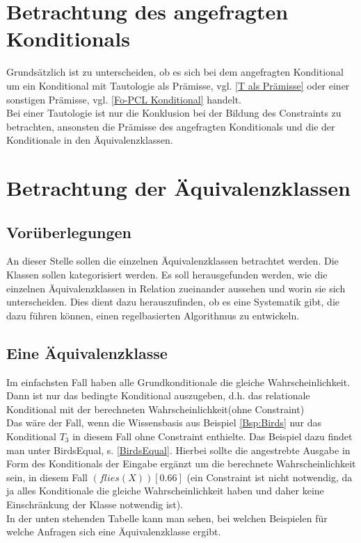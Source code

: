 \documentclass[a4paper, 11pt]{book}
\begin{document}
 












\section{Betrachtung des angefragten Konditionals}
Grundsätzlich ist zu unterscheiden, ob es sich bei dem angefragten Konditional um ein Konditional mit Tautologie als Prämisse, vgl. \ref{T als Prämisse} oder einer sonstigen Prämisse, vgl. \ref{Fo-PCL Konditional} handelt.\\
Bei einer Tautologie ist nur die Konklusion bei der Bildung des Constraints zu betrachten, ansonsten die Prämisse des angefragten Konditionals und die der Konditionale in den Äquivalenzklassen.


\section{Betrachtung der Äquivalenzklassen}
\subsection{Vorüberlegungen}
An dieser Stelle sollen die einzelnen Äquivalenzklassen betrachtet werden. Die Klassen sollen kategorisiert werden. Es soll herausgefunden werden, wie die einzelnen Äquivalenzklassen in Relation zueinander aussehen und worin sie sich unterscheiden. Dies dient dazu herauszufinden, ob es eine Systematik gibt, die dazu führen können, einen regelbasierten Algorithmus zu entwickeln. 
\label{Eine Äquivalenzklasse}
\subsection{Eine Äquivalenzklasse}
Im einfachsten Fall haben alle Grundkonditionale die gleiche Wahrscheinlichkeit. Dann ist nur das bedingte Konditional auszugeben, d.h. das relationale Konditional mit der berechneten Wahrscheinlichkeit(ohne Constraint)\\
Das wäre der Fall, wenn die Wissensbasis aus Beispiel \ref{Bsp:Birds} nur das Konditional $ T_3 $ in diesem Fall ohne Constraint enthielte. Das Beispiel dazu findet man unter BirdsEqual, s. \ref{BirdsEqual}. Hierbei sollte die angestrebte Ausgabe  in Form des Konditionals der Eingabe ergänzt um die berechnete Wahrscheinlichkeit sein, in diesem Fall $ (flies(X)) [0.66]$ (ein Constraint ist nicht notwendig, da ja alles Konditionale die gleiche Wahrscheinlichkeit haben und daher keine Einschränkung der Klasse notwendig ist).\\
In der unten stehenden Tabelle kann man sehen, bei welchen Beispielen für welche Anfragen sich eine Äquivalenzklasse ergibt. 
\end{document}
